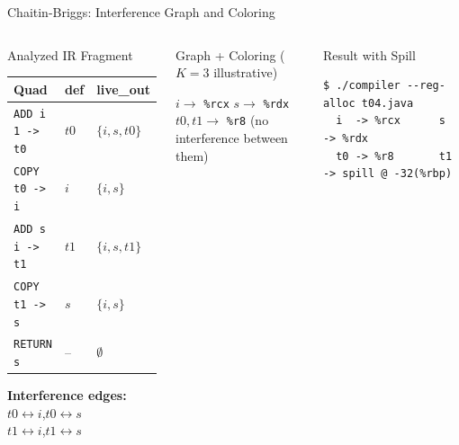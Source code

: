 \documentclass[aspectratio=169,11pt]{beamer}
\newcommand{\reg}[1]{\texttt{\%#1}}
\begin{document}
\begin{frame}[fragile]{Chaitin-Briggs: Interference Graph and Coloring}
\begin{columns}[t]
  \begin{block}{Analyzed IR Fragment}
    \small
    \begin{tabular}{lll}
      \textbf{Quad}          & \textbf{def} & \textbf{live\_out}\\
      \hline
      \texttt{ADD i 1 -> t0} & $t0$ & $\{i, s, t0\}$\\
      \texttt{COPY t0 -> i}  & $i$  & $\{i, s\}$\\
      \texttt{ADD s i -> t1} & $t1$ & $\{i, s, t1\}$\\
      \texttt{COPY t1 -> s}  & $s$  & $\{i, s\}$\\
      \texttt{RETURN s}      & --   & $\emptyset$\\
    \end{tabular}
    \medskip

    \textbf{Interference edges:}\\
    $t0 \leftrightarrow i$,\quad $t0 \leftrightarrow s$\\
    $t1 \leftrightarrow i$,\quad $t1 \leftrightarrow s$
  \end{block}

  \begin{exampleblock}{Graph + Coloring ($K=3$ illustrative)}
    \centering

    \vspace{0.1cm}
    \small
    $i \to$ \reg{rcx} \quad $s \to$ \reg{rdx}\\
    $t0, t1 \to$ \reg{r8} (no interference between them)
  \end{exampleblock}
  \begin{block}{\small Result with Spill}
\begin{lstlisting}[style=asmslide,numbers=none]
$ ./compiler --reg-alloc t04.java
  i  -> %rcx      s  -> %rdx
  t0 -> %r8       t1 -> spill @ -32(%rbp)
\end{lstlisting}
  \end{block}
\end{columns}
\end{frame}
\end{document}
